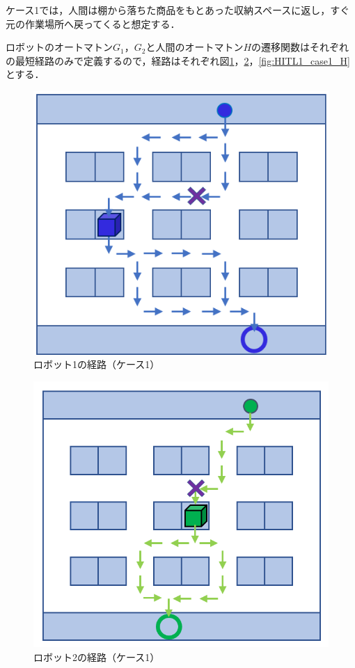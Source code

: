 ケース1では，人間は棚から落ちた商品をもとあった収納スペースに返し，すぐ元の作業場所へ戻ってくると想定する．

ロボットのオートマトン$G_1$，$G_2$と人間のオートマトン$H$の遷移関数はそれぞれの最短経路のみで定義するので，経路はそれぞれ図\ref{fig:HITL1_case1_G1}，\ref{fig:HITL1_case1_G2}，\ref{fig:HITL1_case1_H}とする．

\begin{figure}[b]
    \centering
    \includegraphics[scale=0.38]{figures/HITL1_case1_G1.png}
    \caption{ロボット1の経路（ケース1）}
    \label{fig:HITL1_case1_G1}
\end{figure}
\begin{figure}[!t]
    \centering
    \includegraphics[scale=0.3]{figures/HITL1_case1_G2.png}
    \caption{ロボット2の経路（ケース1）}
    \label{fig:HITL1_case1_G2}
\end{figure}
